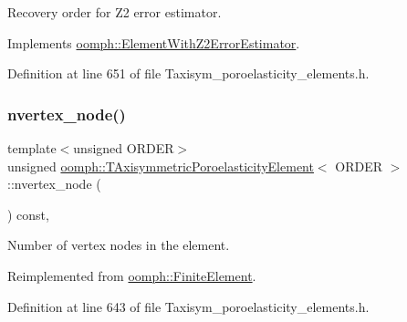 Recovery order for Z2 error estimator. 



Implements \hyperlink{classoomph_1_1ElementWithZ2ErrorEstimator_af39480835bd3e0f6b2f4f7a9a4044798}{oomph\+::\+Element\+With\+Z2\+Error\+Estimator}.



Definition at line 651 of file Taxisym\+\_\+poroelasticity\+\_\+elements.\+h.

\mbox{\label{classoomph_1_1TAxisymmetricPoroelasticityElement_a0ca2892eb086103a351bcd202f10f98d}} 
\subsubsection{\texorpdfstring{nvertex\+\_\+node()}{nvertex\_node()}}
{\footnotesize\ttfamily template$<$unsigned O\+R\+D\+ER$>$ \\
unsigned \hyperlink{classoomph_1_1TAxisymmetricPoroelasticityElement}{oomph\+::\+T\+Axisymmetric\+Poroelasticity\+Element}$<$ O\+R\+D\+ER $>$\+::nvertex\+\_\+node (\begin{DoxyParamCaption}{ }\end{DoxyParamCaption}) const\hspace{0.3cm}{\ttfamily [inline]}, {\ttfamily [virtual]}}



Number of vertex nodes in the element. 



Reimplemented from \hyperlink{classoomph_1_1FiniteElement_a45631a7aa50efc3123a921d114f84cba}{oomph\+::\+Finite\+Element}.



Definition at line 643 of file Taxisym\+\_\+poroelasticity\+\_\+elements.\+h.

\mbox{\label{classoomph_1_1TAxisymmetricPoroelasticityElement_ab7754062a0e98148d1a1bdf153353772}} 
